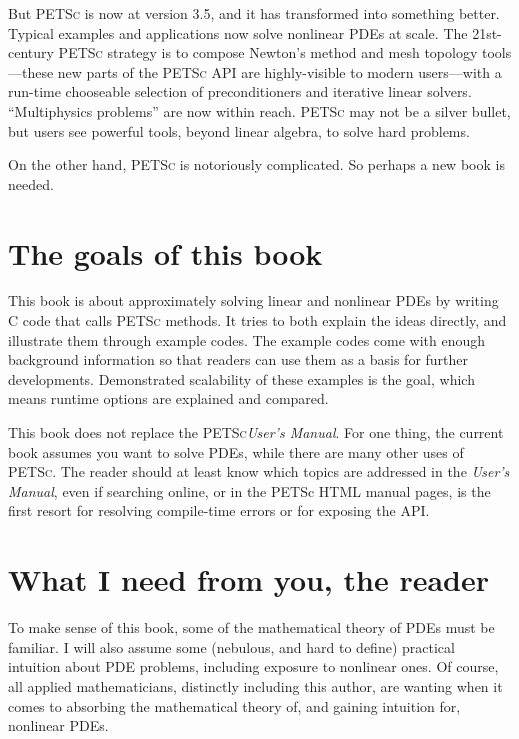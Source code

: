 \documentclass{tufte-book}
\theoremstyle{definition}
\newcommand{\PETSc}{\textsc{PETSc}\xspace}
\begin{document}
But \PETSc is now at version 3.5, and it has transformed into something better.  Typical examples and applications now solve nonlinear PDEs at scale.  The 21st-century \PETSc strategy is to compose Newton's method and mesh topology tools---these new parts of the \PETSc API are highly-visible to modern users---with a run-time chooseable selection of preconditioners and iterative linear solvers.  ``Multiphysics problems'' are now within reach.  \PETSc may not be a silver bullet, but users see powerful tools, beyond linear algebra, to solve hard problems.

On the other hand, \PETSc is notoriously complicated.  So perhaps a new book is needed.

\section{The goals of this book}

This book is about approximately solving linear and nonlinear PDEs by writing C code that calls \PETSc methods.  It tries to both explain the ideas directly, and illustrate them through example codes.  The example codes come with enough background information so that readers can use them as a basis for further developments.  Demonstrated scalability of these examples is the goal, which means runtime options are explained and compared.

This book does not replace the \PETSc \emph{User's Manual}.  For one thing, the current book assumes you want to solve PDEs, while there are many other uses of \PETSc.  The reader should at least know which topics are addressed in the \emph{User's Manual}, even if searching online, or in the PETSc HTML manual pages, is the first resort for resolving compile-time errors or for exposing the API.

\section{What I need from you, the reader}

To make sense of this book, some of the mathematical theory of PDEs must be familiar.  I will also assume some (nebulous, and hard to define) practical intuition about PDE problems, including exposure to nonlinear ones.  Of course, all applied mathematicians, distinctly including this author, are wanting when it comes to absorbing the mathematical theory of, and gaining intuition for, nonlinear PDEs.
\end{document}
